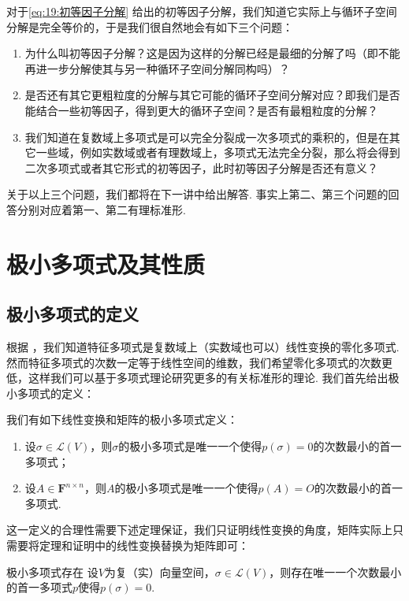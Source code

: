对于\autoref{eq:19:初等因子分解} 给出的初等因子分解，我们知道它实际上与循环子空间分解是完全等价的，于是我们很自然地会有如下三个问题：
\begin{enumerate}
    \item 为什么叫初等因子分解？这是因为这样的分解已经是最细的分解了吗（即不能再进一步分解使其与另一种循环子空间分解同构吗）？
    \item 是否还有其它更粗粒度的分解与其它可能的循环子空间分解对应？即我们是否能结合一些初等因子，得到更大的循环子空间？是否有最粗粒度的分解？
    \item 我们知道在复数域上多项式是可以完全分裂成一次多项式的乘积的，但是在其它一些域，例如实数域或者有理数域上，多项式无法完全分裂，那么将会得到二次多项式或者其它形式的初等因子，此时初等因子分解是否还有意义？
\end{enumerate}

关于以上三个问题，我们都将在下一讲中给出解答. 事实上第二、第三个问题的回答分别对应着第一、第二有理标准形.

\section{极小多项式及其性质}
\subsection{极小多项式的定义}

根据 ，我们知道特征多项式是复数域上（实数域也可以）线性变换的零化多项式. 然而特征多项式的次数一定等于线性空间的维数，我们希望零化多项式的次数更低，这样我们可以基于多项式理论研究更多的有关标准形的理论. 我们首先给出极小多项式的定义：
\begin{definition}{}{}
    我们有如下线性变换和矩阵的极小多项式定义：
    \begin{enumerate}
        \item 设$\sigma\in \mathcal{L}(V)$，则$\sigma$的极小多项式是唯一一个使得$p(\sigma)=0$的次数最小的首一多项式；

        \item 设$A\in\mathbf{F}^{n\times n}$，则$A$的极小多项式是唯一一个使得$p(A)=O$的次数最小的首一多项式.
    \end{enumerate}
\end{definition}
这一定义的合理性需要下述定理保证，我们只证明线性变换的角度，矩阵实际上只需要将定理和证明中的线性变换替换为矩阵即可：
\begin{theorem}{}{极小多项式存在}
    设$V$为复（实）向量空间，$\sigma\in \mathcal{L}(V)$，则存在唯一一个次数最小的首一多项式$p$使得$p(\sigma)=0$.
\end{theorem}

